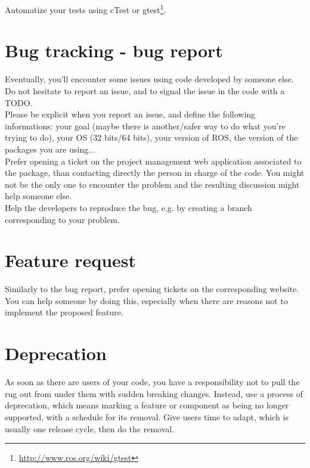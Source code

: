 Automatize your tests using cTest or gtest\footnote{\url{http://www.ros.org/wiki/gtest}}.

\section{Bug tracking - bug report}
Eventually, you'll encounter some issues using code developed by someone else.\\
Do not hesitate to report an issue, and to signal the issue in the code with a TODO.\\
Please be explicit when you report an issue, and define the following informations:
your goal (maybe there is another/safer way to do what you're trying to do), 
your OS (32 bits/64 bits), your version of ROS, the version of the packages you are using...\\

Prefer opening a ticket on the project management web application associated to the package, than contacting directly the person in charge of the code. 
You might not be the only one to encounter the problem and the resulting discussion might help someone else.\\

Help the developers to reproduce the bug, e.g. by creating a branch corresponding to your problem.



\section{Feature request}
Similarly to the bug report, prefer opening tickets on the corresponding website.
You can help someone by doing this, especially when there are reasons not to implement the proposed feature.

\section{Deprecation}
As soon as there are users of your code, you have a responsibility not to pull the rug out from under them with sudden breaking changes. 
Instead, use a process of deprecation, which means marking a feature or component as being no longer supported, with a schedule for its removal. Give users time to adapt, which is usually one release cycle, then do the removal.

